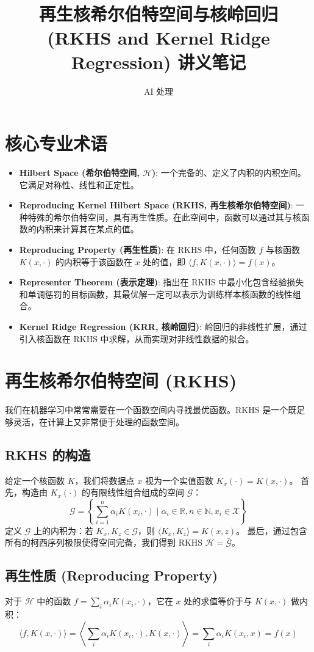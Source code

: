 \documentclass[UTF8]{ctexart}
\title{再生核希尔伯特空间与核岭回归 (RKHS and Kernel Ridge Regression) 讲义笔记}
\author{AI 处理}
\date{}
\begin{document}
\maketitle

\section{核心专业术语}
\begin{itemize}
    \item \textbf{Hilbert Space (希尔伯特空间, $\mathcal{H}$)}: 一个完备的、定义了内积的内积空间。它满足对称性、线性和正定性。
    \item \textbf{Reproducing Kernel Hilbert Space (RKHS, 再生核希尔伯特空间)}: 一种特殊的希尔伯特空间，具有再生性质。在此空间中，函数可以通过其与核函数的内积来计算其在某点的值。
    \item \textbf{Reproducing Property (再生性质)}: 在 RKHS 中，任何函数 $f$ 与核函数 $K(x, \cdot)$ 的内积等于该函数在 $x$ 处的值，即 $\langle f, K(x, \cdot) \rangle = f(x)$。
    \item \textbf{Representer Theorem (表示定理)}: 指出在 RKHS 中最小化包含经验损失和单调惩罚的目标函数，其最优解一定可以表示为训练样本核函数的线性组合。
    \item \textbf{Kernel Ridge Regression (KRR, 核岭回归)}: 岭回归的非线性扩展，通过引入核函数在 RKHS 中求解，从而实现对非线性数据的拟合。
\end{itemize}

\section{再生核希尔伯特空间 (RKHS)}
我们在机器学习中常常需要在一个函数空间内寻找最优函数。RKHS 是一个既足够灵活，在计算上又非常便于处理的函数空间。

\subsection{RKHS 的构造}
给定一个核函数 $K$，我们将数据点 $x$ 视为一个实值函数 $K_x(\cdot) = K(x, \cdot)$。
首先，构造由 $K_x(\cdot)$ 的有限线性组合组成的空间 $\mathcal{G}$：
$$ \mathcal{G} = \left\{ \sum_{i=1}^n \alpha_i K(x_i, \cdot) \mid \alpha_i \in \mathbb{R}, n \in \mathbb{N}, x_i \in \mathcal{X} \right\} $$
定义 $\mathcal{G}$ 上的内积为：若 $K_x, K_z \in \mathcal{G}$，则 $\langle K_x, K_z \rangle = K(x, z)$。
最后，通过包含所有的柯西序列极限使得空间完备，我们得到 RKHS $\mathcal{H} = \bar{\mathcal{G}}$。

\subsection{再生性质 (Reproducing Property)}
对于 $\mathcal{H}$ 中的函数 $f = \sum_i \alpha_i K(x_i, \cdot)$，它在 $x$ 处的求值等价于与 $K(x, \cdot)$ 做内积：
$$ \langle f, K(x, \cdot) \rangle = \left\langle \sum_i \alpha_i K(x_i, \cdot), K(x, \cdot) \right\rangle = \sum_i \alpha_i K(x_i, x) = f(x) $$
\end{document}
